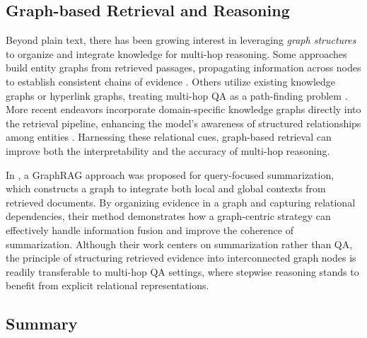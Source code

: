 \documentclass[runningheads]{llncs}
\begin{document}
\subsection{Graph-based Retrieval and Reasoning}
Beyond plain text, there has been growing interest in leveraging \emph{graph structures} to organize and integrate knowledge for multi-hop reasoning. Some approaches build entity graphs from retrieved passages, propagating information across nodes to establish consistent chains of evidence \cite{qiu2019dynamically,ding2019cognitive,fang2019hierarchical}. Others utilize existing knowledge graphs or hyperlink graphs, treating multi-hop QA as a path-finding problem \cite{asai2019learning}. More recent endeavors incorporate domain-specific knowledge graphs directly into the retrieval pipeline, enhancing the model’s awareness of structured relationships among entities \cite{xu2024retrieval,zhu2024structugraphrag,tan2024paths}. Harnessing these relational cues, graph-based retrieval can improve both the interpretability and the accuracy of multi-hop reasoning.


In \cite{edge2024local}, a GraphRAG approach was proposed for query-focused summarization, which constructs a graph to integrate both local and global contexts from retrieved documents. By organizing evidence in a graph and capturing relational dependencies, their method demonstrates how a graph-centric strategy can effectively handle information fusion and improve the coherence of summarization. Although their work centers on summarization rather than QA, the principle of structuring retrieved evidence into interconnected graph nodes is readily transferable to multi-hop QA settings, where stepwise reasoning stands to benefit from explicit relational representations.

\subsection{Summary}
\end{document}
